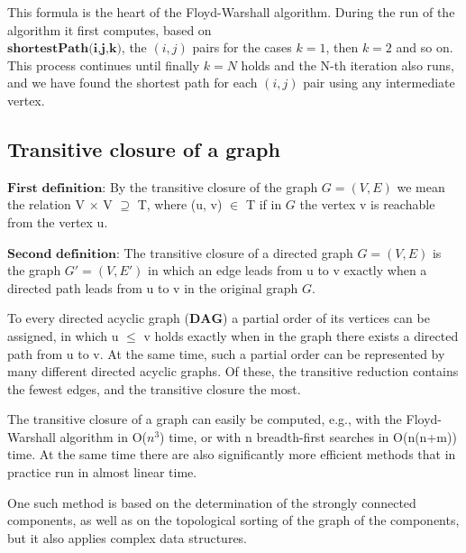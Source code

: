 \documentclass[margin=0px]{article}
\begin{document}
This formula is the heart of the Floyd-Warshall algorithm. During the run of the algorithm it first computes, based on\\
$\textbf{shortestPath(i,j,k)}$, the $(i,j)$ pairs for the cases $k = 1$, then $k = 2$ and so on. This process continues until finally $k = N$ holds and the N-th iteration also runs, and we have found the shortest path for each $(i,j)$ pair using any intermediate vertex.

\subsection{Transitive closure of a graph}
$\textbf{First definition:}$ By the transitive closure of the graph $G = (V, E)$ we mean the relation V × V $\supseteq$ T, where (u, v) $\in$ T if in $G$ the vertex v is reachable from the vertex u.

\begin{flushleft}
$\textbf{Second definition:}$ The transitive closure of a directed graph $G = (V,E)$ is the graph $G' =(V,E')$ in which an edge leads from u to v exactly when a directed path leads from u to v in the original graph $G$.\\
\end{flushleft}

To every directed acyclic graph ($\textbf{DAG}$) a partial order of its vertices can be assigned, in which u $\le$ v holds exactly when in the graph there exists a directed path from u to v. At the same time, such a partial order can be represented by many different directed acyclic graphs. Of these, the transitive reduction contains the fewest edges, and the transitive closure the most.

The transitive closure of a graph can easily be computed, e.g., with the Floyd-Warshall algorithm in O($n^{3}$) time, or with n breadth-first searches in O(n(n+m)) time. At the same time there are also significantly more efficient methods that in practice run in almost linear time.

One such method is based on the determination of the strongly connected components, as well as on the topological sorting of the graph of the components, but it also applies complex data structures.
\end{document}
